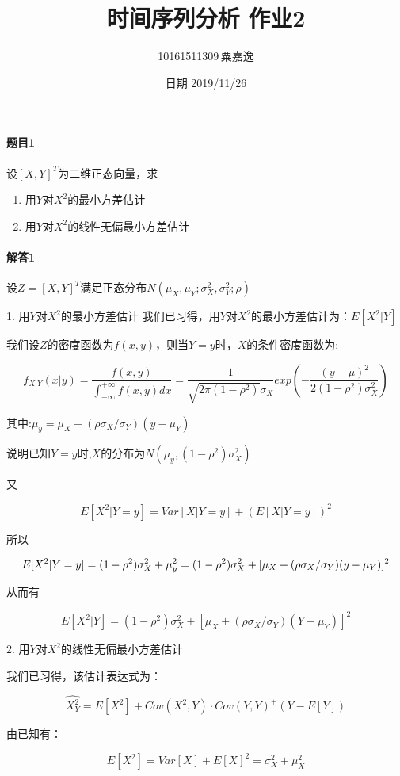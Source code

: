 \documentclass[12pt, a4paper]{ctexart}
\title{时间序列分析 作业2}
\author{10161511309\,粟嘉逸}
\date{日期 2019/11/26}
\begin{document}
\maketitle{}

\paragraph{题目1}
设$[X,Y]^T$为二维正态向量，求
        \begin{enumerate}
        \item 用$Y$对$X^2$的最小方差估计
        \item 用$Y$对$X^2$的线性无偏最小方差估计
        \end{enumerate}	
\paragraph{解答1}

设$Z=[X,Y]^T$满足正态分布$N(\mu_X,\mu_Y;\sigma_X^2,\sigma_Y^2;\rho)$

1. 用$Y$对$X^2$的最小方差估计
我们已习得，用$Y$对$X^2$的最小方差估计为：$E[X^2|Y]$

我们设$Z$的密度函数为$f(x,y)$，则当$Y=y$时，$X$的条件密度函数为:

\[
    f_{X|Y}(x|y)=\dfrac{f(x,y)}{\int_{-\infty}^{+\infty}f(x,y)dx}
    =\dfrac{1}{\sqrt{2\pi(1-\rho^2)}\sigma_X}exp(-\dfrac{(y-\mu)^2}{2(1-\rho^2)\sigma_X^2})
\]

其中:$\mu_y=\mu_X+(\rho\sigma_X/\sigma_Y)(y-\mu_Y)$

说明已知$Y=y$时,$X$的分布为$N(\mu_y,(1-\rho^2)\sigma_X^2)$

又

\[
    E[X^2|Y=y] = Var[X|Y=y] + (E[X|Y=y])^2
\]

所以

$$
    E[X^2|Y=y] = (1-\rho^2)\sigma_X^2 + \mu_y^2 \\
               = (1-\rho^2)\sigma_X^2 + [\mu_X+(\rho\sigma_X/\sigma_Y)(y-\mu_Y)]^2
$$

从而有

\[
    E[X^2|Y] = (1-\rho^2)\sigma_X^2 + [\mu_X+(\rho\sigma_X/\sigma_Y)(Y-\mu_Y)]^2
\]

2. 用$Y$对$X^2$的线性无偏最小方差估计

我们已习得，该估计表达式为：

\[
    \hat{X^2_Y} = E[X^2] + Cov(X^2,Y)\cdot Cov(Y,Y)^+ (Y-E[Y])
\]

由已知有：

\[
    E[X^2] = Var[X] + E[X]^2 = \sigma_X^2+ \mu_X^2
\]
\end{document}
